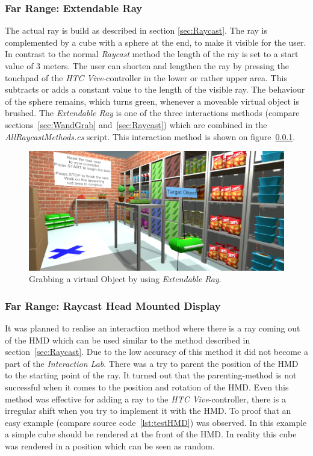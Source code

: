 \subsubsection{Far Range: Extendable Ray} \label{sec:ExtendableRay}
The actual ray is build as described in section \ref{sec:Raycast}. The ray \cite{website:Ray} is complemented by a cube with a sphere at the end, to make it visible for the user. In contrast to the normal \textit{Raycast} method the length of the ray is set to a start value of 3 meters. The user can shorten and lengthen the ray by pressing the touchpad of the \textit{HTC Vive}-controller in the lower or rather upper area. This subtracts or adds a constant value to the length of the visible ray. The behaviour of the sphere remains, which turns green, whenever a moveable virtual object is brushed. The \textit{Extendable Ray} is one of the three interactions methods (compare sections~\ref{sec:WandGrab} and~\ref{sec:Raycast}) which are combined in the \textit{AllRaycastMethods.cs} script. This interaction method is shown on figure~\ref{sec:ExtendableRay}.

\begin{figure}[H] 
	\center 
	\includegraphics[width=12cm]{Images/ExtendableRay.PNG}			
	\caption[Grabbing a virtual Object by using \textit{Extendable Ray}.]{Grabbing a virtual Object by using \textit{Extendable Ray}.}
	\label{fig:extendableRay}
\end{figure} 


\subsubsection{Far Range: Raycast Head Mounted Display} \label{sec:RaycastHMD}
It was planned to realise an interaction method where there is a ray coming out of the HMD which can be used similar to the method described in section~\ref{sec:Raycast}. Due to the low accuracy of this method it did not become a part of the \textit{Interaction Lab}. There was a try to parent \cite{website:SetParent} the position of the HMD to the starting point of the ray. It turned out that the parenting-method is not successful when it comes to the position and rotation of the HMD. Even this method was effective for adding a ray to the \textit{HTC Vive}-controller, there is a irregular shift when you try to implement it with the HMD. To proof that an easy example (compare source code~\ref{lst:testHMD}) was observed. In this example a simple cube should be rendered at the front of the HMD. In reality this cube was rendered in a position which can be seen as random. 

